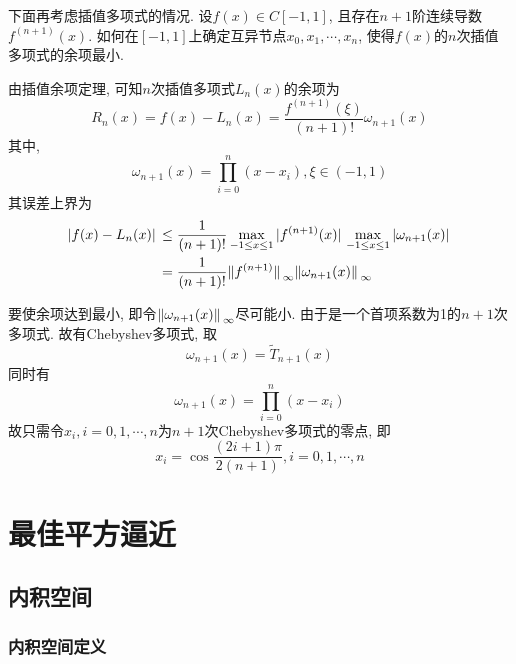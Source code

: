 下面再考虑插值多项式的情况. 设$f(x)\in C[-1,1]$, 且存在$n+1$阶连续导数$f^{(n+1)}(x)$. 如何在$[-1,1]$上确定互异节点$x_0,x_1,\cdots,x_n$, 使得$f(x)$的$n$次插值多项式的余项最小.

由插值余项定理, 可知$n$次插值多项式$L_n(x)$的余项为
\begin{equation*}
    R_n(x)=f(x)-L_n(x)=\frac{f^{(n+1)}(\xi)}{(n+1)!}\omega_{n+1}(x)
\end{equation*}
其中, 
\begin{equation*}
    \omega_{n+1}(x)=\prod_{i=0}^n(x-x_i), \xi\in(-1,1)
\end{equation*}
其误差上界为
\begin{align*}
    \abs*{f(x)-L_n(x)}&\le\frac{1}{(n+1)!}\max_{-1\le x\le1}\abs*{f^{(n+1)}(x)}\max_{-1\le x\le1}\abs*{\omega_{n+1}(x)}\\
    &=\frac{1}{(n+1)!}\norm*{f^{(n+1)}}_\infty\norm*{\omega_{n+1}(x)}_\infty
\end{align*}

要使余项达到最小, 即令$\norm*{\omega_{n+1}(x)}_\infty$尽可能小. 由于是一个首项系数为1的$n+1$次多项式. 故有Chebyshev多项式, 取
\begin{equation*}
    \omega_{n+1}(x)=\widetilde{T}_{n+1}(x)
\end{equation*}
同时有
\begin{equation*}
    \omega_{n+1}(x)=\prod_{i=0}^n(x-x_i)
\end{equation*}
故只需令$x_i,i=0,1,\cdots,n$为$n+1$次Chebyshev多项式的零点, 即
\begin{equation*}
    x_i=\cos\frac{(2i+1)\pi}{2(n+1)}, i=0,1,\cdots,n
\end{equation*}

\section{最佳平方逼近}

\subsection{内积空间}

\subsubsection{内积空间定义}

